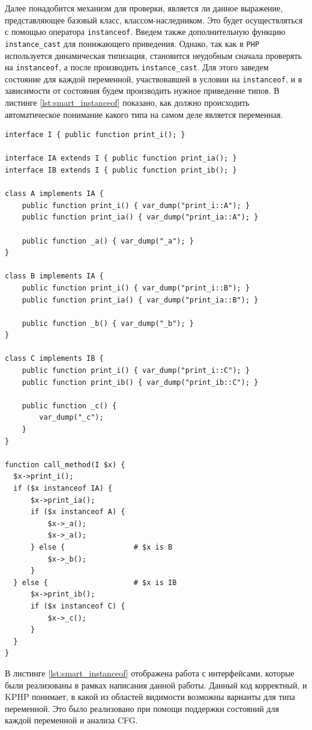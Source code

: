 Далее понадобится механизм для проверки, является ли данное выражение, представляющее базовый класс, классом-наследником.
Это будет осуществляться с помощью оператора \verb|instanceof|.
Введем также дополнительную функцию \verb|instance_cast| для понижающего приведения.
Однако, так как в \verb|PHP| используется динамическая типизация, становится неудобным сначала проверять на \verb|instanceof|, а после производить \verb|instance_cast|.
Для этого заведем состояние для каждой переменной, участвовавшей в условии на \verb|instanceof|, и в зависимости от состояния будем производить нужное приведение типов.
В листинге \ref{lst:smart_instanceof} показано, как должно происходить автоматическое понимание какого типа на самом деле является переменная.
\begin{lstlisting}[caption={Пример использования умного оператора instanceof},label={lst:smart_instanceof}]
interface I { public function print_i(); }

interface IA extends I { public function print_ia(); }
interface IB extends I { public function print_ib(); }

class A implements IA {
    public function print_i() { var_dump("print_i::A"); }
    public function print_ia() { var_dump("print_ia::A"); }

    public function _a() { var_dump("_a"); }
}

class B implements IA {
    public function print_i() { var_dump("print_i::B"); }
    public function print_ia() { var_dump("print_ia::B"); }

    public function _b() { var_dump("_b"); }
}

class C implements IB {
    public function print_i() { var_dump("print_i::C"); }
    public function print_ib() { var_dump("print_ib::C"); }

    public function _c() {
        var_dump("_c");
    }
}

function call_method(I $x) {
  $x->print_i();
  if ($x instanceof IA) {
      $x->print_ia();
      if ($x instanceof A) {
          $x->_a();
          $x->_a();
      } else {                # $x is B
          $x->_b();
      }
  } else {                    # $x is IB
      $x->print_ib();
      if ($x instanceof C) {
          $x->_c();
      }
  }
}
\end{lstlisting}

В листинге \ref{lst:smart_instanceof} отображена работа с интерфейсами, которые были реализованы в рамках написания данной работы.
Данный код корректный, и KPHP понимает, в какой из областей видимости возможны варианты для типа переменной.
Это было реализовано при помощи поддержки состояний для каждой переменной и анализа CFG.

